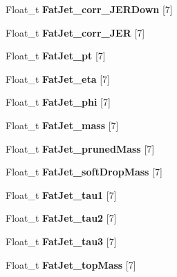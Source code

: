 \begin{DoxyCompactItemize}
Float\+\_\+t {\bfseries Fat\+Jet\+\_\+corr\+\_\+\+J\+E\+R\+Down} \mbox{[}7\mbox{]}
\item 
\hypertarget{classMiniTree_ae6f608018efbce8d48ac7e8dc6ec6263}{}\label{classMiniTree_ae6f608018efbce8d48ac7e8dc6ec6263} 
Float\+\_\+t {\bfseries Fat\+Jet\+\_\+corr\+\_\+\+J\+ER} \mbox{[}7\mbox{]}
\item 
\hypertarget{classMiniTree_a3bda243237b8504f63b3060a0fa7fe78}{}\label{classMiniTree_a3bda243237b8504f63b3060a0fa7fe78} 
Float\+\_\+t {\bfseries Fat\+Jet\+\_\+pt} \mbox{[}7\mbox{]}
\item 
\hypertarget{classMiniTree_adea1e98fd2d5b4b3cca05972fc752584}{}\label{classMiniTree_adea1e98fd2d5b4b3cca05972fc752584} 
Float\+\_\+t {\bfseries Fat\+Jet\+\_\+eta} \mbox{[}7\mbox{]}
\item 
\hypertarget{classMiniTree_a572db907d40b66810cc45b99c047e510}{}\label{classMiniTree_a572db907d40b66810cc45b99c047e510} 
Float\+\_\+t {\bfseries Fat\+Jet\+\_\+phi} \mbox{[}7\mbox{]}
\item 
\hypertarget{classMiniTree_a2d4375fc40015ecffb6f627d1a4fc105}{}\label{classMiniTree_a2d4375fc40015ecffb6f627d1a4fc105} 
Float\+\_\+t {\bfseries Fat\+Jet\+\_\+mass} \mbox{[}7\mbox{]}
\item 
\hypertarget{classMiniTree_a5ae4586a9270978d04a9fddfb2e55251}{}\label{classMiniTree_a5ae4586a9270978d04a9fddfb2e55251} 
Float\+\_\+t {\bfseries Fat\+Jet\+\_\+pruned\+Mass} \mbox{[}7\mbox{]}
\item 
\hypertarget{classMiniTree_a801bc2905f187bc73de9d5ee8e1e6e10}{}\label{classMiniTree_a801bc2905f187bc73de9d5ee8e1e6e10} 
Float\+\_\+t {\bfseries Fat\+Jet\+\_\+soft\+Drop\+Mass} \mbox{[}7\mbox{]}
\item 
\hypertarget{classMiniTree_aa9f5713783e6b9bd9079f67dd9d3053e}{}\label{classMiniTree_aa9f5713783e6b9bd9079f67dd9d3053e} 
Float\+\_\+t {\bfseries Fat\+Jet\+\_\+tau1} \mbox{[}7\mbox{]}
\item 
\hypertarget{classMiniTree_a96c9dedecf57296ee4bc0bfa7661055f}{}\label{classMiniTree_a96c9dedecf57296ee4bc0bfa7661055f} 
Float\+\_\+t {\bfseries Fat\+Jet\+\_\+tau2} \mbox{[}7\mbox{]}
\item 
\hypertarget{classMiniTree_aec81cf21ee995467b95a3e0589d1d7d3}{}\label{classMiniTree_aec81cf21ee995467b95a3e0589d1d7d3} 
Float\+\_\+t {\bfseries Fat\+Jet\+\_\+tau3} \mbox{[}7\mbox{]}
\item 
\hypertarget{classMiniTree_a3f25c17666ae4c64860d8d15e7a72834}{}\label{classMiniTree_a3f25c17666ae4c64860d8d15e7a72834} 
Float\+\_\+t {\bfseries Fat\+Jet\+\_\+top\+Mass} \mbox{[}7\mbox{]}

\end{DoxyCompactItemize}
